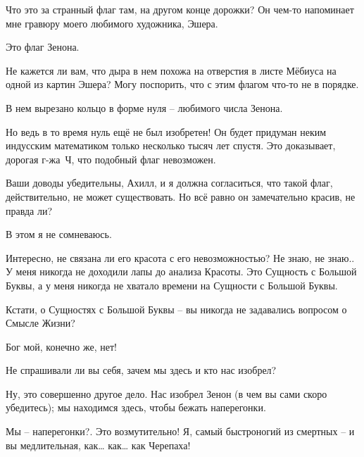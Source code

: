 \documentclass[../main.tex]{subfiles}
\begin{document}


\begin{dialogue}

 Что это за странный флаг там, на другом конце дорожки? Он чем-то напоминает мне гравюру моего любимого художника, Эшера.

 Это флаг Зенона.

 Не кажется ли вам, что дыра в нем похожа на отверстия в листе Мёбиуса на одной из картин Эшера? Могу поспорить, что с этим флагом что-то не в порядке.

 В нем вырезано кольцо в форме нуля \--- любимого числа Зенона.

 Но ведь в то время нуль ещё не был изобретен! Он будет придуман неким индусским математиком только несколько тысяч лет спустя. Это доказывает, дорогая г-жа~Ч, что подобный флаг невозможен.

 Ваши доводы убедительны, Ахилл, и я должна согласиться, что такой флаг, действительно, не может существовать. Но всё равно он замечательно красив, не правда ли?

 В этом я не сомневаюсь.

 Интересно, не связана ли его красота с его невозможностью? Не знаю, не знаю.. У меня никогда не доходили лапы до анализа Красоты. Это Сущность с Большой Буквы, а у меня никогда не хватало времени на Сущности с Большой Буквы.

 Кстати, о Сущностях с Большой Буквы \--- вы никогда не задавались вопросом о Смысле Жизни?

 Бог мой, конечно же, нет!

 Не спрашивали ли вы себя, зачем мы здесь и кто нас изобрел?

 Ну, это совершенно другое дело. Нас изобрел Зенон (в чем вы сами скоро убедитесь); мы находимся здесь, чтобы бежать наперегонки.

 Мы \--- наперегонки?. Это возмутительно! Я, самый быстроногий из смертных \--- и вы медлительная, как\ldots{} как\ldots{} как Черепаха!


\end{dialogue}
\end{document}
